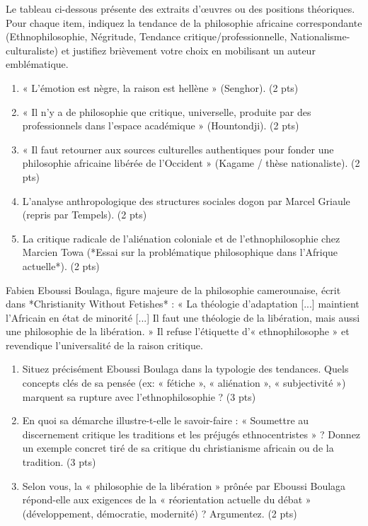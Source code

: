 \documentclass[11pt]{article}
\begin{document}
\begin{exercice}
Le tableau ci-dessous présente des extraits d'œuvres ou des positions théoriques. Pour chaque item, indiquez la tendance de la philosophie africaine correspondante (Ethnophilosophie, Négritude, Tendance critique/professionnelle, Nationalisme-culturaliste) et justifiez brièvement votre choix en mobilisant un auteur emblématique.
\begin{enumerate}
    \item « L'émotion est nègre, la raison est hellène » (Senghor). \hfill (2 pts)
    \item « Il n'y a de philosophie que critique, universelle, produite par des professionnels dans l'espace académique » (Hountondji). \hfill (2 pts)
    \item « Il faut retourner aux sources culturelles authentiques pour fonder une philosophie africaine libérée de l'Occident » (Kagame / thèse nationaliste). \hfill (2 pts)
    \item L'analyse anthropologique des structures sociales dogon par Marcel Griaule (repris par Tempels). \hfill (2 pts)
    \item La critique radicale de l'aliénation coloniale et de l'ethnophilosophie chez Marcien Towa (*Essai sur la problématique philosophique dans l'Afrique actuelle*). \hfill (2 pts)
\end{enumerate}
\end{exercice}

\begin{exercice}
Fabien Eboussi Boulaga, figure majeure de la philosophie camerounaise, écrit dans *Christianity Without Fetishes* : « La théologie d'adaptation [...] maintient l'Africain en état de minorité [...] Il faut une théologie de la libération, mais aussi une philosophie de la libération. » Il refuse l'étiquette d'« ethnophilosophe » et revendique l'universalité de la raison critique.
\begin{enumerate}
    \item Situez précisément Eboussi Boulaga dans la typologie des tendances. Quels concepts clés de sa pensée (ex: « fétiche », « aliénation », « subjectivité ») marquent sa rupture avec l'ethnophilosophie ? (3 pts)
    \item En quoi sa démarche illustre-t-elle le savoir-faire : « Soumettre au discernement critique les traditions et les préjugés ethnocentristes » ? Donnez un exemple concret tiré de sa critique du christianisme africain ou de la tradition. (3 pts)
    \item Selon vous, la « philosophie de la libération » prônée par Eboussi Boulaga répond-elle aux exigences de la « réorientation actuelle du débat » (développement, démocratie, modernité) ? Argumentez. (2 pts)
\end{enumerate}
\end{exercice}
\end{document}
